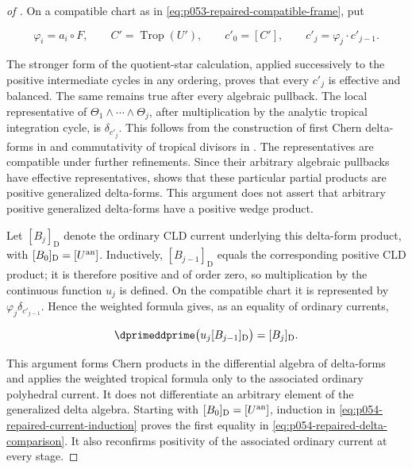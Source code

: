 \begin{proof}[of
]
On a compatible chart as in
\eqref{eq:p053-repaired-compatible-frame}, put

\[
 \varphi_i=a_i\circ F,
 \qquad C'=\operatorname{Trop}(U'),
 \qquad c'_0=[C'],
 \qquad c'_j=\varphi_j\cdot c'_{j-1}.
\]

The stronger form of the quotient-star calculation, applied successively
to the positive intermediate cycles in any ordering, proves that every
\(c'_j\) is effective and balanced.  The same remains true after every algebraic
pullback.  The local representative of
\(\Theta_1\wedge\cdots\wedge\Theta_j\), after multiplication by the
analytic tropical integration cycle, is \(\delta_{c'_j}\).  This follows
from the construction of first Chern delta-forms in
\cite[\S\S9.13--9.14]{GK17} and commutativity of tropical divisors in
\cite[Proposition~1.14]{GK17}.  The representatives are compatible under
further refinements.  Since their arbitrary algebraic pullbacks have
effective representatives, \cite[Proposition~2.13]{GK19} shows that these
particular partial products are positive generalized delta-forms.  This
argument does not assert that arbitrary positive generalized delta-forms
have a positive wedge product.

Let \([B_j]_{\mathrm D}\) denote the ordinary CLD current underlying this
delta-form product, with \([B_0]_{\mathrm D}=[U^{\mathrm{an}}]\).  Inductively,
\([B_{j-1}]_{\mathrm D}\) equals the corresponding positive CLD product;
it is therefore positive and of order zero, so multiplication by the
continuous function \(u_j\) is defined.  On the compatible chart it is
represented by \(\varphi_j\delta_{c'_{j-1}}\).  Hence the weighted formula
\cite[Corollary~3.20]{GK17} gives, as an equality of ordinary currents,

\begin{equation}
 \dprimeddprime\bigl(u_j[B_{j-1}]_{\mathrm D}\bigr)
 =[B_j]_{\mathrm D}.
 \label{eq:p054-repaired-current-induction}
\end{equation}

This argument forms Chern products in the differential algebra of
delta-forms and applies the weighted tropical formula only to the associated
ordinary polyhedral current.  It does not differentiate an arbitrary element
of the generalized delta algebra.  Starting with
\([B_0]_{\mathrm D}=[U^{\mathrm{an}}]\), induction in
\eqref{eq:p054-repaired-current-induction} proves the first equality in
\eqref{eq:p054-repaired-delta-comparison}.  It also reconfirms positivity of
the associated ordinary current at every stage.


\end{proof}
